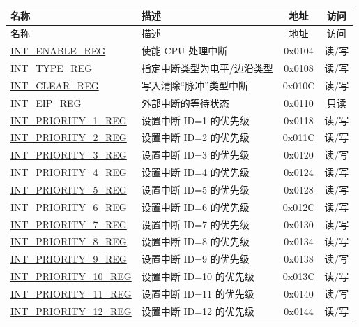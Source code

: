 
\begin{longtable}{ | p{4.0cm} | p{8.4cm} | c | c| }
\hline\rowcolor{lightgray}
名称 & 描述 & 地址 & 访问 \\ \hline
\endfirsthead
\hline
\rowcolor{lightgray}
名称 & 描述 & 地址 & 访问 \\ \hline
\hline
\endhead
\endfoot

\hyperref[regdesc:INTENABLEREG] {INT\_ENABLE\_REG} & 使能 CPU 处理中断 & 0x0104 & 读/写 \\\hline
\hyperref[regdesc:INTTYPEREG]{INT\_TYPE\_REG} & 指定中断类型为电平/边沿类型 & 0x0108 & 读/写 \\\hline
\hyperref[regdesc:INTCLEARREG] {INT\_CLEAR\_REG} & 写入清除“脉冲”类型中断 & 0x010C & 读/写 \\\hline
\hyperref[regdesc:INTEIPREG]{INT\_EIP\_REG} & 外部中断的等待状态 & 0x0110 & 只读 \\\hline
\hyperref[regdesc:INTPRIORITYREG]{INT\_PRIORITY\_1\_REG} & 设置中断 ID=1 的优先级 & 0x0118 & 读/写 \\\hline
\hyperref[regdesc:INTPRIORITYREG]{INT\_PRIORITY\_2\_REG} & 设置中断 ID=2 的优先级 & 0x011C & 读/写 \\\hline
\hyperref[regdesc:INTPRIORITYREG]{INT\_PRIORITY\_3\_REG} & 设置中断 ID=3 的优先级 & 0x0120 & 读/写 \\\hline
\hyperref[regdesc:INTPRIORITYREG]{INT\_PRIORITY\_4\_REG} & 设置中断 ID=4 的优先级 & 0x0124 & 读/写 \\\hline
\hyperref[regdesc:INTPRIORITYREG]{INT\_PRIORITY\_5\_REG} & 设置中断 ID=5 的优先级 & 0x0128 & 读/写 \\\hline
\hyperref[regdesc:INTPRIORITYREG]{INT\_PRIORITY\_6\_REG} & 设置中断 ID=6 的优先级 & 0x012C & 读/写 \\\hline
\hyperref[regdesc:INTPRIORITYREG]{INT\_PRIORITY\_7\_REG} & 设置中断 ID=7 的优先级 & 0x0130 & 读/写 \\\hline
\hyperref[regdesc:INTPRIORITYREG]{INT\_PRIORITY\_8\_REG} & 设置中断 ID=8 的优先级 & 0x0134 & 读/写 \\\hline
\hyperref[regdesc:INTPRIORITYREG]{INT\_PRIORITY\_9\_REG} & 设置中断 ID=9 的优先级 & 0x0138 & 读/写 \\\hline
\hyperref[regdesc:INTPRIORITYREG]{INT\_PRIORITY\_10\_REG} & 设置中断 ID=10 的优先级 & 0x013C & 读/写 \\\hline
\hyperref[regdesc:INTPRIORITYREG]{INT\_PRIORITY\_11\_REG} & 设置中断 ID=11 的优先级 & 0x0140 & 读/写 \\\hline
\hyperref[regdesc:INTPRIORITYREG]{INT\_PRIORITY\_12\_REG} & 设置中断 ID=12 的优先级 & 0x0144 & 读/写 \\\hline

\end{longtable}
